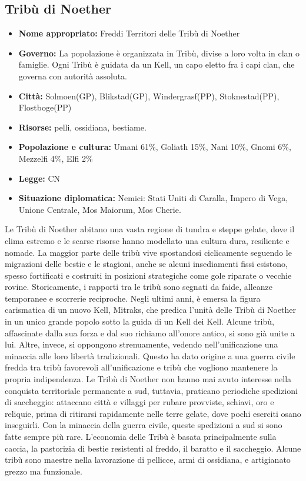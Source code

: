 \documentclass[10pt, a4paper]{report}
\begin{document}
\begin{multicols}{2}
\subsection*{Tribù di Noether}
\begin{itemize}
	\item \textbf{Nome appropriato:} Freddi Territori delle Tribù di Noether
	\item \textbf{Governo:} La popolazione è organizzata in Tribù, divise a loro volta in clan o famiglie. Ogni Tribù è guidata da un Kell, un capo eletto fra i capi clan, che governa con autorità assoluta. 
	\item \textbf{Città:} Solmoen(GP), Blikstad(GP), Windergrasf(PP), Stoknestad(PP), Flostboge(PP)
	\item \textbf{Risorse:} pelli, ossidiana, bestiame. 
	\item \textbf{Popolazione e cultura:} Umani 61\%, Goliath 15\%, Nani 10\%, Gnomi 6\%, Mezzelfi 4\%, Elfi 2\% 
	\item \textbf{Legge:} CN
	\item \textbf{Situazione diplomatica:} Nemici: Stati Uniti di Caralla, Impero di Vega, Unione Centrale, Mos Maiorum, Mos Cherie.
\end{itemize}
Le Tribù di Noether abitano una vasta regione di tundra e steppe gelate, dove il clima estremo e le scarse risorse hanno modellato una cultura dura, resiliente e nomade. La maggior parte delle tribù vive spostandosi ciclicamente seguendo le migrazioni delle bestie e le stagioni, anche se alcuni insediamenti fissi esistono, spesso fortificati e costruiti in posizioni strategiche come gole riparate o vecchie rovine. Storicamente, i rapporti tra le tribù sono segnati da faide, alleanze temporanee e scorrerie reciproche. Negli ultimi anni, è emersa la figura carismatica di un nuovo Kell, Mitraks, che predica l'unità delle Tribù di Noether in un unico grande popolo sotto la guida di un Kell dei Kell. Alcune tribù, affascinate dalla sua forza e dal suo richiamo all'onore antico, si sono già unite a lui. Altre, invece, si oppongono strenuamente, vedendo nell'unificazione una minaccia alle loro libertà tradizionali.
Questo ha dato origine a una guerra civile fredda tra tribù favorevoli all'unificazione e tribù che vogliono mantenere la propria indipendenza.
Le Tribù di Noether non hanno mai avuto interesse nella conquista territoriale permanente a sud, tuttavia, praticano periodiche spedizioni di saccheggio: attaccano città e villaggi per rubare provviste, schiavi, oro e reliquie, prima di ritirarsi rapidamente nelle terre gelate, dove pochi eserciti osano inseguirli. Con la minaccia della guerra civile, queste spedizioni a sud si sono fatte sempre più rare. L'economia delle Tribù è basata principalmente sulla caccia, la pastorizia di bestie resistenti al freddo, il baratto e il saccheggio. Alcune tribù sono maestre nella lavorazione di pellicce, armi di ossidiana, e artigianato grezzo ma funzionale.


\end{multicols}
\end{document}
